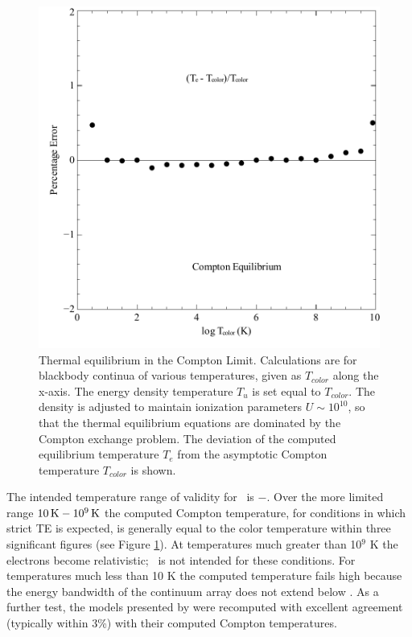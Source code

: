 \begin{figure}
\centering
\label{fig:ComptonEquilibriumError}
\includegraphics[scale=0.7]{ComptonEquilibriumError}
\caption[Compton Equilibrium Error]{Thermal equilibrium in the Compton Limit. Calculations are for
blackbody continua of various temperatures, given as $T_{color}$ along the x-axis.
The energy density temperature $T_u$ is set equal to $T_{color}$.  The density is
adjusted to maintain ionization parameters $U\sim  10^{10}$, so that the thermal
equilibrium equations are dominated by the Compton exchange problem.  The
deviation of the computed equilibrium temperature $T_e$ from the asymptotic
Compton temperature $T_{color}$ is shown.}
\end{figure}

The intended temperature range of validity for \Cloudy\ is \TEMPLIMITLOW $ -$\TEMPLIMITHIGH.  Over the more limited range $10 {\rm\thinspace K} - 10^9 {\rm\thinspace K}$ the computed Compton
 temperature, for conditions in which strict TE is expected, is generally
equal to the color temperature within three significant figures
(see Figure \ref{fig:ComptonEquilibriumError}).
At temperatures much greater than 10$^9$ K the electrons become
relativistic; \Cloudy\ is not intended for these conditions.  For temperatures
much less than 10 K the computed temperature fails high because the energy
bandwidth of the continuum array does not extend
below \emm .
As
a further test, the models presented by \citep{Krolik1981}
were recomputed with excellent agreement (typically within 3\%) with their
computed Compton temperatures.

